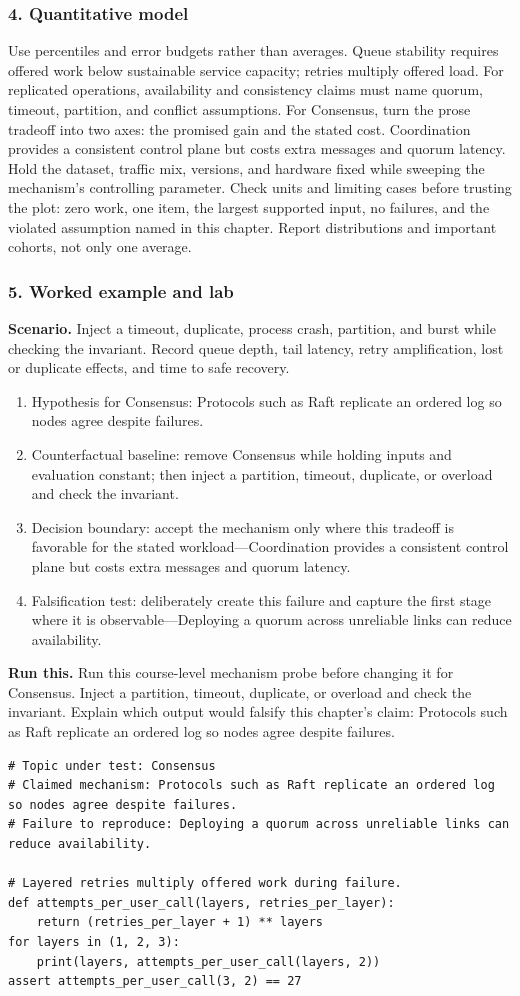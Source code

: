 \subsubsection*{4. Quantitative model}
Use percentiles and error budgets rather than averages. Queue stability requires offered work below sustainable service capacity; retries multiply offered load. For replicated operations, availability and consistency claims must name quorum, timeout, partition, and conflict assumptions.
For Consensus, turn the prose tradeoff into two axes: the promised gain and the stated cost. Coordination provides a consistent control plane but costs extra messages and quorum latency. Hold the dataset, traffic mix, versions, and hardware fixed while sweeping the mechanism's controlling parameter.
Check units and limiting cases before trusting the plot: zero work, one item, the largest supported input, no failures, and the violated assumption named in this chapter. Report distributions and important cohorts, not only one average.
\subsubsection*{5. Worked example and lab}
\textbf{Scenario.} Inject a timeout, duplicate, process crash, partition, and burst while checking the invariant. Record queue depth, tail latency, retry amplification, lost or duplicate effects, and time to safe recovery.
\begin{enumerate}
\item Hypothesis for Consensus: Protocols such as Raft replicate an ordered log so nodes agree despite failures.
\item Counterfactual baseline: remove Consensus while holding inputs and evaluation constant; then inject a partition, timeout, duplicate, or overload and check the invariant.
\item Decision boundary: accept the mechanism only where this tradeoff is favorable for the stated workload—Coordination provides a consistent control plane but costs extra messages and quorum latency.
\item Falsification test: deliberately create this failure and capture the first stage where it is observable—Deploying a quorum across unreliable links can reduce availability.
\end{enumerate}
\textbf{Run this.} Run this course-level mechanism probe before changing it for Consensus. Inject a partition, timeout, duplicate, or overload and check the invariant. Explain which output would falsify this chapter's claim: Protocols such as Raft replicate an ordered log so nodes agree despite failures.
\begin{Verbatim}[fontsize=\scriptsize]
# Topic under test: Consensus
# Claimed mechanism: Protocols such as Raft replicate an ordered log so nodes agree despite failures.
# Failure to reproduce: Deploying a quorum across unreliable links can reduce availability.

# Layered retries multiply offered work during failure.
def attempts_per_user_call(layers, retries_per_layer):
    return (retries_per_layer + 1) ** layers
for layers in (1, 2, 3):
    print(layers, attempts_per_user_call(layers, 2))
assert attempts_per_user_call(3, 2) == 27
\end{Verbatim}
